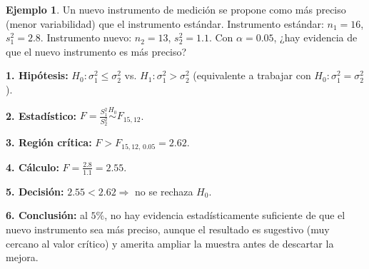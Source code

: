 \documentclass[11pt,a4paper]{article}
\theoremstyle{plain}
\theoremstyle{definition}
\newtheorem{ejemplo}[teorema]{Ejemplo}
\theoremstyle{remark}
\begin{document}
\begin{center}
\end{center}

\begin{ejemplo}
Un nuevo instrumento de medición se propone como más preciso (menor variabilidad) que el instrumento estándar. Instrumento estándar: $n_1=16$, $s_1^2=2.8$. Instrumento nuevo: $n_2=13$, $s_2^2=1.1$. Con $\alpha=0.05$, ¿hay evidencia de que el nuevo instrumento es más preciso?

\textbf{1. Hipótesis:} $H_0:\sigma_1^2\le\sigma_2^2$ vs. $H_1:\sigma_1^2>\sigma_2^2$ (equivalente a trabajar con $H_0:\sigma_1^2=\sigma_2^2$).

\textbf{2. Estadístico:} $\displaystyle F=\frac{S_1^2}{S_2^2}\overset{H_0}{\sim}F_{15,12}$.

\textbf{3. Región crítica:} $F>F_{15,12,\,0.05}=2.62$.

\textbf{4. Cálculo:} $\displaystyle F=\frac{2.8}{1.1}=2.55$.

\textbf{5. Decisión:} $2.55<2.62\Rightarrow$ no se rechaza $H_0$.

\textbf{6. Conclusión:} al $5\%$, no hay evidencia estadísticamente suficiente de que el nuevo instrumento sea más preciso, aunque el resultado es sugestivo (muy cercano al valor crítico) y amerita ampliar la muestra antes de descartar la mejora.
\end{ejemplo}
\end{document}
